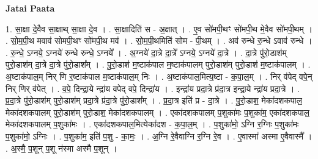\documentclass[17pt]{extarticle}
\begin{document}
\textbf{Jatai Paata} \newline

1. सा॒क्षा दे॒वैव सा॒क्षाथ् सा॒क्षा दे॒व । . सा॒क्षादिति॑ स - अ॒क्षात् । . ए॒व सो॑मपी॒थꣳ सो॑मपी॒थ मे॒वैव सो॑मपी॒थम् । . सो॒म॒पी॒थ मवाव॑ सोमपी॒थꣳ सो॑मपी॒थ मव॑ । . सो॒म॒पी॒थमिति॑ सोम - पी॒थम् । . अव॑ रुन्धे रु॒न्धे ऽवाव॑ रुन्धे । . रु॒न्धे॒ ऽग्नये॒ ऽग्नये॑ रुन्धे रुन्धे॒ ऽग्नये᳚ । . अ॒ग्नये॑ दा॒त्रे दा॒त्रे᳚ ऽग्नये॒ ऽग्नये॑ दा॒त्रे । . दा॒त्रे पु॑रो॒डाश॑म् पुरो॒डाश॑म् दा॒त्रे दा॒त्रे पु॑रो॒डाश᳚म् । . पु॒रो॒डाश॑ म॒ष्टाक॑पाल म॒ष्टाक॑पालम् पुरो॒डाश॑म् पुरो॒डाश॑ म॒ष्टाक॑पालम् । . अ॒ष्टाक॑पाल॒म् निर् णि र॒ष्टाक॑पाल म॒ष्टाक॑पाल॒म् निः । . अ॒ष्टाक॑पाल॒मित्य॒ष्टा - क॒पा॒ल॒म् । . निर् व॑पेद् वपे॒न् निर् णिर् व॑पेत् । . व॒पे॒ दिन्द्रा॒ये न्द्रा॑य वपेद् वपे॒ दिन्द्रा॑य । . इन्द्रा॑य प्रदा॒त्रे प्र॑दा॒त्र इन्द्रा॒ये न्द्रा॑य प्रदा॒त्रे । . प्र॒दा॒त्रे पु॑रो॒डाश॑म् पुरो॒डाश॑म् प्रदा॒त्रे प्र॑दा॒त्रे पु॑रो॒डाश᳚म् । . प्र॒दा॒त्र इति॑ प्र - दा॒त्रे । . पु॒रो॒डाश॒ मेका॑दशकपाल॒ मेका॑दशकपालम् पुरो॒डाश॑म् पुरो॒डाश॒ मेका॑दशकपालम् । . एका॑दशकपालम् प॒शुका॑मः प॒शुका॑म॒ एका॑दशकपाल॒ मेका॑दशकपालम् प॒शुका॑मः । . एका॑दशकपाल॒मित्येका॑दश - क॒पा॒ल॒म् । . प॒शुका॑मो॒ ऽग्नि र॒ग्निः प॒शुका॑मः प॒शुका॑मो॒ ऽग्निः । . प॒शुका॑म॒ इति॑ प॒शु - का॒मः॒ । . अ॒ग्नि रे॒वैवाग्नि र॒ग्नि रे॒व । . ए॒वास्मा॑ अस्मा ए॒वैवास्मै᳚ । . अ॒स्मै॒ प॒शून् प॒शू न॑स्मा अस्मै प॒शून् । \newline
\end{document}
